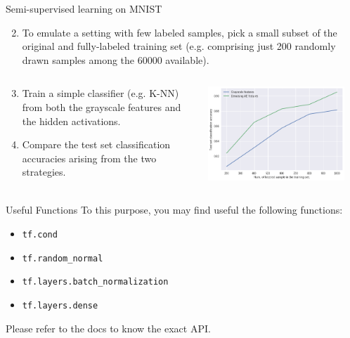 \documentclass[aspectratio=169]{beamer}
\begin{document}
\begin{frame}{Semi-supervised learning on MNIST}
\begin{enumerate}
    \setcounter{enumi}{1}
    \item To emulate a setting with few labeled samples, pick a small subset of the original and fully-labeled training set (e.g. comprising just 200 randomly drawn samples among the 60000 available).
\end{enumerate}
\begin{columns}
\begin{column}{0.4\textwidth}
\begin{enumerate}
    \setcounter{enumi}{2}
    \item Train a simple classifier (e.g. K-NN) from both the grayscale features and the hidden activations. 
    \item Compare the test set classification accuracies arising from the two strategies.
\end{enumerate}\end{column}
\begin{column}{0.6\textwidth}  %
    \begin{center}
	\includegraphics[width=0.90\textwidth]{img/autoencoder/accuracies.png}
     \end{center}
\end{column}
\end{columns}
\end{frame}


\begin{frame}{Useful Functions}
To this purpose, you may find useful the following functions:
\begin{itemize}
\item \texttt{tf.cond}
\item \texttt{tf.random\_normal}
\item \texttt{tf.layers.batch\_normalization}
\item \texttt{tf.layers.dense}
\end{itemize}
Please refer to the docs to know the exact API.
\end{frame}
\end{document}
